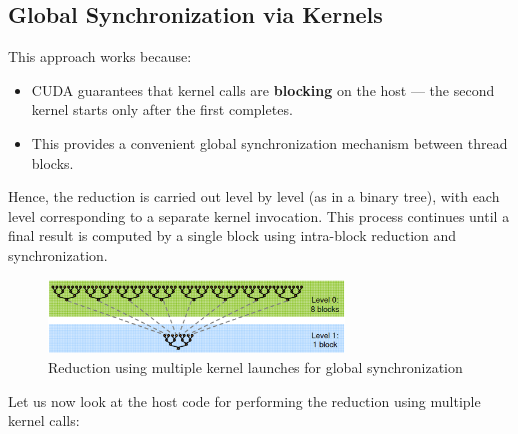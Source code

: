 \documentclass[12pt]{book}
\begin{document}
\subsection*{Global Synchronization via Kernels}

This approach works because:
\begin{itemize}
    \item CUDA guarantees that kernel calls are \textbf{blocking} on the host — the second kernel starts only after the first completes.
    \item This provides a convenient global synchronization mechanism between thread blocks.
\end{itemize}

Hence, the reduction is carried out level by level (as in a binary tree), with each level corresponding to a separate kernel invocation. This process continues until a final result is computed by a single block using intra-block reduction and synchronization.

\begin{figure}[ht]
    \centering
    \includegraphics[width=0.7\textwidth]{images/reduction.png}
    \caption{Reduction using multiple kernel launches for global synchronization}
    \label{fig:reduction}
\end{figure}

Let us now look at the host code for performing the reduction using multiple kernel calls:
\end{document}
